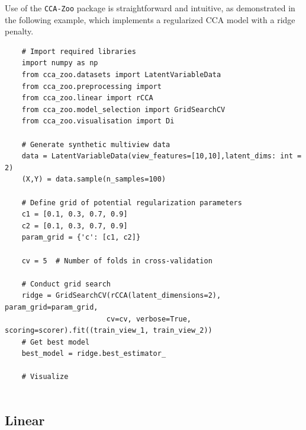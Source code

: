 Use of the \texttt{CCA-Zoo} package is straightforward and intuitive, as demonstrated in the following example, which implements a regularized CCA model with a ridge penalty.

\begin{verbatim}
    # Import required libraries
    import numpy as np
    from cca_zoo.datasets import LatentVariableData
    from cca_zoo.preprocessing import
    from cca_zoo.linear import rCCA
    from cca_zoo.model_selection import GridSearchCV
    from cca_zoo.visualisation import Di
    
    # Generate synthetic multiview data
    data = LatentVariableData(view_features=[10,10],latent_dims: int = 2)
    (X,Y) = data.sample(n_samples=100)

    # Define grid of potential regularization parameters
    c1 = [0.1, 0.3, 0.7, 0.9]
    c2 = [0.1, 0.3, 0.7, 0.9]
    param_grid = {'c': [c1, c2]}

    cv = 5  # Number of folds in cross-validation

    # Conduct grid search
    ridge = GridSearchCV(rCCA(latent_dimensions=2), param_grid=param_grid,
                        cv=cv, verbose=True, scoring=scorer).fit((train_view_1, train_view_2))
    # Get best model
    best_model = ridge.best_estimator_

    # Visualize


    \end{verbatim}

\subsection{Linear}

